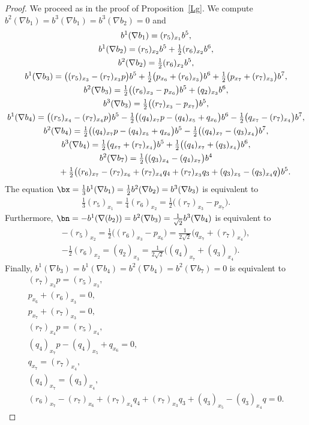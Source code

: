 \begin{proof}
We proceed as in the proof of Proposition~\ref{Lg}. We compute $b^2(\nabla b_1)=b^3(\nabla b_1) =b^3(\nabla b_2) =0$ and
\begin{gather*}
b^1(\nabla b_1) = (r_5)_{x_1} b^5, \\
b^1(\nabla b_2)= (r_5)_{x_2} b^5+\tfrac12 (r_6)_{x_2} b^6,\\
b^2(\nabla b_2)= \tfrac12 (r_6)_{x_2} b^5,\\
b^1(\nabla b_3)= \big((r_5)_{x_3}- (r_7)_{x_3 }p\big) b^5+\tfrac12 \big(p_{x_6}+(r_6)_{x_3}\big) b^6+\tfrac12 \big(p_{x_7}+(r_7)_{x_3}\big) b^7,\\
 b^2(\nabla b_3)= \tfrac12 \big((r_6)_{x_3}-p_{x_6}\big) b^5 +(q_2)_{x_3}b^6,\\
b^3(\nabla b_3)= \tfrac12 \big((r_7)_{x_3}-p_{x_7}\big) b^5,\\
b^1(\nabla b_4)= \big((r_5)_{x_4}-(r_7)_{x_4}p\big)b^5-\tfrac12\big((q_4)_{x_7}p-(q_4)_{x_5}+q_{x_6} \big)b^6-\tfrac12\big(q_{x_7}-(r_7)_{x_4}\big)b^7,\\
b^2(\nabla b_4)= \tfrac12\big((q_4)_{x_7}p-(q_4)_{x_5}+q_{x_6}\big)b^5-\tfrac12\big((q_4)_{x_7}-(q_3)_{x_4}\big)b^7,\\
b^3(\nabla b_4)= \tfrac12\big(q_{x_7}+(r_7)_{x_4}\big)b^5+\tfrac12\big((q_4)_{x_7}+(q_3)_{x_4}\big)b^6,\\
b^2(\nabla b_7)= \tfrac12\big((q_3)_{x_4}-(q_4)_{x_7}\big)b^4 \\
\hphantom{b^2(\nabla b_7)=}{} +\tfrac12\big((r_6)_{x_7} -(r_7)_{x_6}+(r_7)_{x_4}q_4+(r_7)_{x_3}q_3+(q_3)_{x_5}-(q_3)_{x_4}q\big)b^5.
\end{gather*}
The equation $\bx=\frac13 b^1(\nabla b_1)=\frac12 b^2(\nabla b_2)=b^3(\nabla b_3)$ is equivalent to
\begin{gather}
\tfrac13(r_5)_{x_1} = \tfrac14(r_6)_{x_2} =\tfrac12 \big((r_7)_{x_3}-p_{x_7}\big).\label{ED1}
\end{gather}
Furthermore, $\bn=-b^1(\nabla(b_2))=b^2(\nabla b_3)=\frac1{\sqrt 2} b^3(\nabla b_4)$ is equivalent to
\begin{gather}
 -(r_5)_{x_2} =\tfrac12 \big((r_6)_{x_3}-p_{x_6}\big)=\tfrac1{2\sqrt 2} \big(q_{x_7}+(r_7)_{x_4}\big),\label{ED2}\\
- \tfrac12 (r_6)_{x_2} =(q_2)_{x_3} =\tfrac1{2\sqrt 2}\big((q_4)_{x_7}+(q_3)_{x_4}\big).\label{ED3}
\end{gather}
Finally, $ b^1(\nabla b_3) =b^1(\nabla b_4)=b^2(\nabla b_4 )=b^2(\nabla b_7)=0$ is equivalent to
\begin{gather}
 (r_7)_{x_3 }p=(r_5)_{x_3}, \label{ED4}\\
 p_{x_6}+(r_6)_{x_3}=0, \label{ED5}\\
 p_{x_7}+(r_7)_{x_3}=0, \label{ED6}\\
(r_7)_{x_4}p=(r_5)_{x_4}, \label{ED7}\\
(q_4)_{x_7}p-(q_4)_{x_5}+q_{x_6} =0, \label{ED8}\\
q_{x_7}=(r_7)_{x_4}, \label{ED9}\\
(q_4)_{x_7}=(q_3)_{x_4}, \label{ED11}\\
 (r_6)_{x_7}-(r_7)_{x_6}+(r_7)_{x_4}q_4+(r_7)_{x_3}q_3+(q_3)_{x_5}-(q_3)_{x_4}q=0.\label{ED12}
 \end{gather}


\end{proof}

